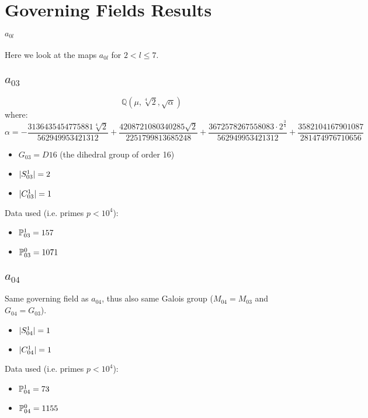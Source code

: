 
\section{Governing Fields Results}
\label{governingFieldsResults}
\paragraph{{\LARGE $a_{0l}$}}
Here we look at the maps $a_{0l}$ for $2 < l \leq 7$.
\subsection{{\huge $a_{03}$}}
$$\mathbb{Q}\left(\mu, \sqrt[4]{2}, \sqrt{\alpha}\right)$$
where:
$$\alpha = - \frac{3136435454775881 \sqrt[4]{2}}{562949953421312} + \frac{4208721080340285 \sqrt{2}}{2251799813685248} + \frac{3672578267558083 \cdot 2^{\frac{3}{4}}}{562949953421312} + \frac{3582104167901087}{281474976710656}$$
\begin{itemize}
	\item $G_{03} = D16$ (the dihedral group of order 16)
	\item $| S_{03}^1 | = 2$
	\item $| C_{03}^1 | = 1$
\end{itemize}
Data used (i.e. primes $p<10^4$):
\begin{itemize}
	\item $\mathbb{P}_{03}^1 = 157$
	\item $\mathbb{P}_{03}^0 = 1071$
\end{itemize}
\subsection{{\huge $a_{04}$}}
Same governing field as $a_{04}$, thus also same Galois group ($M_{04} = M_{03}$ and $G_{04} = G_{03}$).
\begin{itemize}
	\item $| S_{04}^1 | = 1$
	\item $| C_{04}^1 | = 1$
\end{itemize}
Data used (i.e. primes $p<10^4$):
\begin{itemize}
	\item $\mathbb{P}_{04}^1 = 73$
	\item $\mathbb{P}_{04}^0 = 1155$
\end{itemize}
